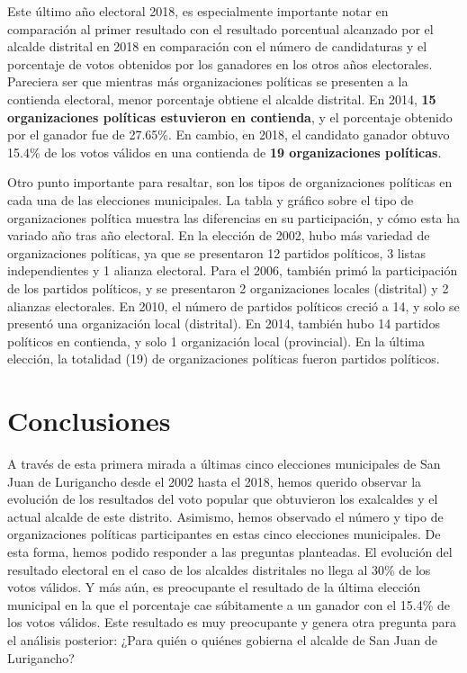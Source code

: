 \documentclass[
]{book}
\begin{document}
Este último año electoral 2018, es especialmente importante notar en comparación al primer resultado con el resultado porcentual alcanzado por el alcalde distrital en 2018 en comparación con el número de candidaturas y el porcentaje de votos obtenidos por los ganadores en los otros años electorales. Pareciera ser que mientras más organizaciones políticas se presenten a la contienda electoral, menor porcentaje obtiene el alcalde distrital. En 2014, \textbf{15 organizaciones políticas estuvieron en contienda}, y el porcentaje obtenido por el ganador fue de 27.65\%. En cambio, en 2018, el candidato ganador obtuvo 15.4\% de los votos válidos en una contienda de \textbf{19 organizaciones políticas}.

Otro punto importante para resaltar, son los tipos de organizaciones políticas en cada una de las elecciones municipales. La tabla y gráfico sobre el tipo de organizaciones política muestra las diferencias en su participación, y cómo esta ha variado año tras año electoral. En la elección de 2002, hubo más variedad de organizaciones políticas, ya que se presentaron 12 partidos políticos, 3 listas independientes y 1 alianza electoral. Para el 2006, también primó la participación de los partidos políticos, y se presentaron 2 organizaciones locales (distrital) y 2 alianzas electorales. En 2010, el número de partidos políticos creció a 14, y solo se presentó una organización local (distrital). En 2014, también hubo 14 partidos políticos en contienda, y solo 1 organización local (provincial). En la última elección, la totalidad (19) de organizaciones políticas fueron partidos políticos.

\hypertarget{conclusiones-2}{%
\section{Conclusiones}\label{conclusiones-2}}

A través de esta primera mirada a últimas cinco elecciones municipales de San Juan de Lurigancho desde el 2002 hasta el 2018, hemos querido observar la evolución de los resultados del voto popular que obtuvieron los exalcaldes y el actual alcalde de este distrito. Asimismo, hemos observado el número y tipo de organizaciones políticas participantes en estas cinco elecciones municipales. De esta forma, hemos podido responder a las preguntas planteadas. El evolución del resultado electoral en el caso de los alcaldes distritales no llega al 30\% de los votos válidos. Y más aún, es preocupante el resultado de la última elección municipal en la que el porcentaje cae súbitamente a un ganador con el 15.4\% de los votos válidos. Este resultado es muy preocupante y genera otra pregunta para el análisis posterior: ¿Para quién o quiénes gobierna el alcalde de San Juan de Lurigancho?
\end{document}
